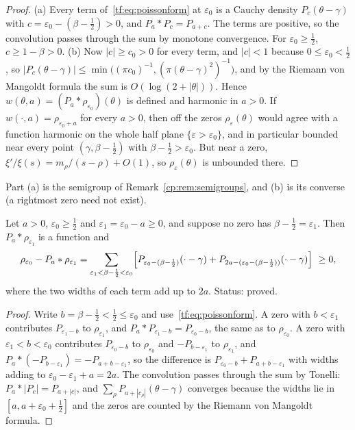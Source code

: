 \begin{proof}
(a) Every term of~\eqref{tf:eq:poissonform} at $\varepsilon_0$ is a Cauchy density $P_c(\theta-\gamma)$ with $c=\varepsilon_0-(\beta-\tfrac12)>0$, and $P_a*P_c=P_{a+c}$. The terms are positive, so the convolution passes through the sum by monotone convergence. For $\varepsilon_0\ge\tfrac12$, $c\ge1-\beta>0$. (b) Now $|c|\ge c_0>0$ for every term, and $|c|<1$ because $0\le\varepsilon_0<\tfrac12$, so $|P_c(\theta-\gamma)|\le\min\big((\pi c_0)^{-1},(\pi(\theta-\gamma)^2)^{-1}\big)$, and by the Riemann von Mangoldt formula the sum is $O(\log(2+|\theta|))$. Hence $w(\theta,a)=(P_a*\rho_{\varepsilon_0})(\theta)$ is defined and harmonic in $a>0$. If $w(\cdot,a)=\rho_{\varepsilon_0+a}$ for every $a>0$, then off the zeros $\rho_\varepsilon(\theta)$ would agree with a function harmonic on the whole half plane $\{\varepsilon>\varepsilon_0\}$, and in particular bounded near every point $(\gamma,\beta-\tfrac12)$ with $\beta-\tfrac12>\varepsilon_0$. But near a zero, $\xi'/\xi(s)=m_\rho/(s-\rho)+O(1)$, so $\rho_\varepsilon(\theta)$ is unbounded there.
\end{proof}

Part (a) is the semigroup of Remark~\ref{cp:rem:semigroups}, and (b) is its converse (a rightmost zero need not exist).


\begin{proposition}\label{tf:prop:defect}
Let $a>0$, $\varepsilon_0\ge\tfrac12$ and $\varepsilon_1=\varepsilon_0-a\ge0$, and suppose no zero has $\beta-\tfrac12=\varepsilon_1$. Then $P_a*\rho_{\varepsilon_1}$ is a function and
\[
\rho_{\varepsilon_0}-P_a*\rho_{\varepsilon_1}=\sum_{\varepsilon_1<\beta-\frac12<\varepsilon_0}\Bigl[P_{\varepsilon_0-(\beta-\frac12)}(\cdot-\gamma)+P_{2a-(\varepsilon_0-(\beta-\frac12))}(\cdot-\gamma)\Bigr]\ \ge0,
\]
where the two widths of each term add up to $2a$. Status: proved.
\end{proposition}

\begin{proof}
Write $b=\beta-\tfrac12<\tfrac12\le\varepsilon_0$ and use~\eqref{tf:eq:poissonform}. A zero with $b<\varepsilon_1$ contributes $P_{\varepsilon_1-b}$ to $\rho_{\varepsilon_1}$, and $P_a*P_{\varepsilon_1-b}=P_{\varepsilon_0-b}$, the same as to $\rho_{\varepsilon_0}$. A zero with $\varepsilon_1<b<\varepsilon_0$ contributes $P_{\varepsilon_0-b}$ to $\rho_{\varepsilon_0}$ and $-P_{b-\varepsilon_1}$ to $\rho_{\varepsilon_1}$, and $P_a*(-P_{b-\varepsilon_1})=-P_{a+b-\varepsilon_1}$, so the difference is $P_{\varepsilon_0-b}+P_{a+b-\varepsilon_1}$ with widths adding to $\varepsilon_0-\varepsilon_1+a=2a$. The convolution passes through the sum by Tonelli: $P_a*|P_c|=P_{a+|c|}$, and $\sum_\rho P_{a+|c_\rho|}(\theta-\gamma)$ converges because the widths lie in $[a,a+\varepsilon_0+\tfrac12]$ and the zeros are counted by the Riemann von Mangoldt formula.
\end{proof}

